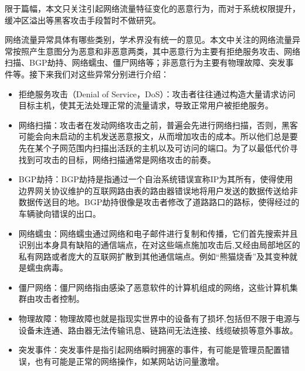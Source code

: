 

限于篇幅，本文只关注引起网络流量特征变化的恶意行为，而对于系统权限提升，缓冲区溢出等黑客攻击手段暂时不做研究。


网络流量异常具体有哪些类别，学术界没有统一的意见。本文中关注的网络流量异常按照产生意图分为恶意和非恶意两类，其中恶意行为主要有拒绝服务攻击、网络扫描、BGP劫持、网络蠕虫、僵尸网络等；非恶意行为主要有物理故障、突发事件等。接下来我们对这些异常分别进行介绍：

\begin{itemize}
  \item 拒绝服务攻击（Denial of Service，DoS）：攻击者往往通过构造大量请求访问目标主机，使其无法处理正常的流量请求，导致正常用户被拒绝服务。
  \item 网络扫描：攻击者在发动网络攻击之前，普遍会先进行网络扫描，否则，黑客可能会向未启动的主机发送恶意报文，从而增加攻击的成本。所以他们总是要先在某个子网范围内扫描出活跃的主机以及可访问的端口。为了以最低代价寻找到可攻击的目标，网络扫描通常是网络攻击的前奏。
  \item BGP劫持：BGP劫持是指通过一个自治系统错误宣称IP为其所有，使得使用边界网关协议维护的互联网路由表的路由器错误地将用户发送的数据传送给非数据传送目的地。BGP劫持很像是攻击者修改了道路路口的路标，使得经过的车辆驶向错误的出口。
  \item 网络蠕虫：网络蠕虫通过网络和电子邮件进行复制和传播，它们首先搜索并且识别出本身具有缺陷的通信端点，在对这些端点施加攻击后,又经由局部地区的私有网路或者庞大的互联网扩散到其他通信端点。例如“熊猫烧香”及其变种就是蠕虫病毒。
  \item 僵尸网络：僵尸网络指由感染了恶意软件的计算机组成的网络，这些计算机集群由攻击者控制。
  \item 物理故障：物理故障也就是指现实世界中的设备有了损坏,包括但不限于电源与设备未连通、路由器无法传输讯息、链路间无法连接、线缆破损等意外事故。
  \item  突发事件：突发事件是指引起网络瞬时拥塞的事件，有可能是管理员配置错误，也有可能是正常的网络操作，如某网站访问量激增。
\end{itemize}

